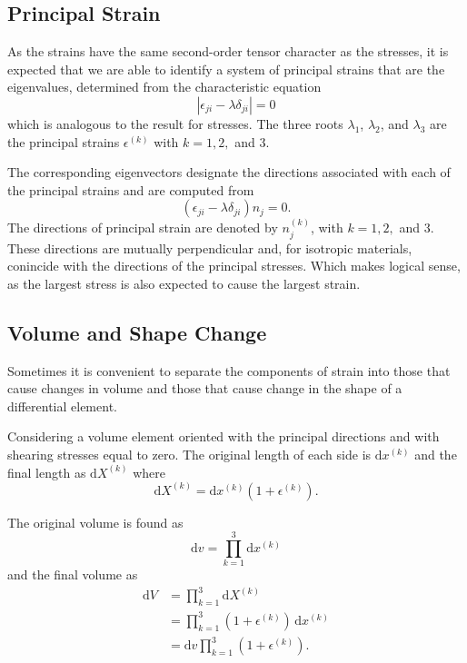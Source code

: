 
\subsection{Principal Strain}
As the strains have the same second-order tensor character as the stresses, it is expected that we are able to identify a system of principal strains that are the eigenvalues, determined from the characteristic equation
\begin{equation*}
  \left| \epsilon_{ji} - \lambda \delta_{ji} \right| = 0
\end{equation*}
which is analogous to the result for stresses.
The three roots $\lambda_1$, $\lambda_2$, and $\lambda_3$ are the principal strains $\epsilon^{(k)}$ with $k = 1,2,$ and 3.

The corresponding eigenvectors designate the directions associated with each of the principal strains and are computed from
\begin{equation*}
  \left( \epsilon_{ji} - \lambda \delta_{ji} \right)n_j = 0
.\end{equation*}
The directions of principal strain are denoted by $n_j^{(k)}$, with $k = 1, 2, $ and 3.
These directions are mutually perpendicular and, for isotropic materials, conincide with the directions of the principal stresses.
Which makes logical sense, as the largest stress is also expected to cause the largest strain.

\subsection{Volume and Shape Change}
Sometimes it is convenient to separate the components of strain into those that cause changes in volume and those that cause change in the shape of a differential element.

Considering a volume element oriented with the principal directions and with shearing stresses equal to zero.
The original length of each side is $\mathrm{d}x^{(k)}$ and the final length as $\mathrm{d}X^{(k)}$ where
\begin{equation*}
  \mathrm{d}X^{(k)} = \mathrm{d}x^{(k)} \left( 1 + \epsilon^{(k)} \right)
.\end{equation*}

The original volume is found as
\begin{equation*}
  \mathrm{d}v = \prod_{k = 1}^{3} \mathrm{d}x^{(k)}
\end{equation*}
and the final volume as
\begin{align*}
  \mathrm{d}V &= \prod_{k = 1}^{3} \mathrm{d}X^{(k)} \\
  &= \prod_{k = 1}^{3} \left( 1 + \epsilon^{(k)} \right) \, \mathrm{d}x^{(k)} \\
  &= \mathrm{d}v \prod_{k = 1}^{3} \left( 1 + \epsilon^{(k)} \right)
.\end{align*}

